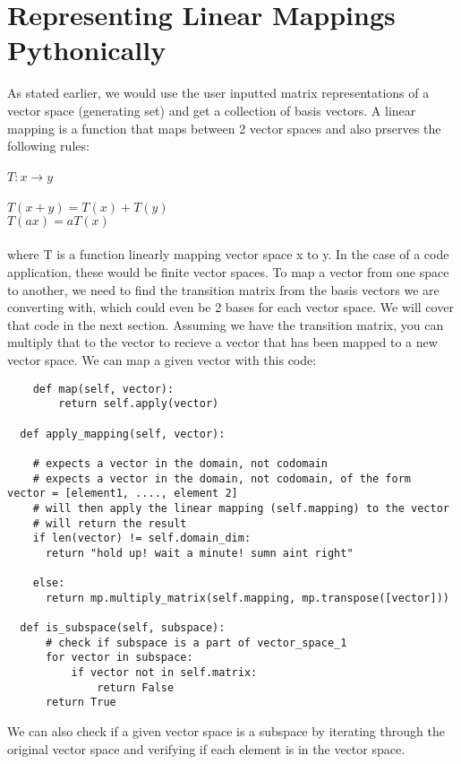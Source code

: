 \documentclass[12pt, a4paper]{article}
\begin{document}
\section{Representing Linear Mappings Pythonically}

As stated earlier, we would use the user inputted matrix representations of a vector space (generating set) and get a collection of basis vectors.
A linear mapping is a function that maps between 2 vector spaces and also prserves the following rules:
\\
\\
            $T: x \rightarrow y$
\\
\\
            $T(x + y) = T(x) + T(y)$
            \\
            $T(ax) = aT(x)$
\\
\\

where T is a function linearly mapping vector space x to y. In the case of a code application, these would be finite vector spaces.
To map a vector from one space to another, we need to find the transition matrix from the basis vectors we are converting with, which could even be 2 bases for each vector space. 
We will cover that code in the next section. Assuming we have the transition matrix, you can multiply that to the vector to recieve a vector that has been mapped to a new vector space. 
We can map a given vector with this code:

\begin{lstlisting}
    def map(self, vector):
        return self.apply(vector)

  def apply_mapping(self, vector):

    # expects a vector in the domain, not codomain
    # expects a vector in the domain, not codomain, of the form  vector = [element1, ...., element 2]
    # will then apply the linear mapping (self.mapping) to the vector
    # will return the result
    if len(vector) != self.domain_dim:
      return "hold up! wait a minute! sumn aint right"

    else:
      return mp.multiply_matrix(self.mapping, mp.transpose([vector]))

  def is_subspace(self, subspace):
      # check if subspace is a part of vector_space_1
      for vector in subspace:
          if vector not in self.matrix:
              return False
      return True
\end{lstlisting}

We can also check if a given vector space is a subspace by iterating through the original vector space and verifying if each element is in the vector space.
\end{document}
